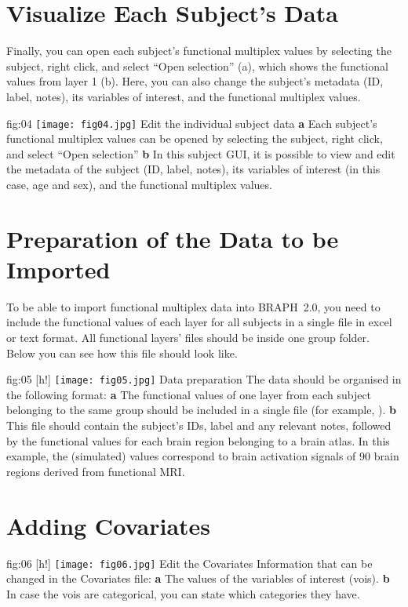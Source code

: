 \documentclass[justified]{tufte-handout}
\begin{document}
\section{Visualize Each Subject's Data}

Finally, you can open each subject's functional multiplex values by selecting the subject, right click, and select ``Open selection'' (a), which shows the functional values from layer 1 (b). Here, you can also change the subject's metadata (ID, label, notes), its variables of interest, and the functional multiplex values.

	{fig:04}
	{\texttt{[image: fig04.jpg]}
	}
	{Edit the individual subject data}
	{
	{\bf a}  Each subject's functional multiplex values can be opened by selecting the subject, right click, and select ``Open selection''
	{\bf b} In this subject GUI, it is possible to view and edit the metadata of the subject (ID, label, notes), its variables of interest (in this case, age and sex), and the functional multiplex values. 
	}

\clearpage
\section{Preparation of the Data to be Imported}

To be able to import functional multiplex data into BRAPH~2.0, you need to include the functional values of each layer for all subjects in a single file in excel or text format. All functional layers' files should be inside one group folder. Below you can see how this file should look like.

	{fig:05}
	{
	[h!]
	\texttt{[image: fig05.jpg]}
	}
	{Data preparation}
	{
	The data should be organised in the following format:
	{\bf a} The functional values of one layer from each subject belonging to the same group should be included in a single file (for example, ). 
	{\bf b} This file should contain the subject's IDs, label and any relevant notes, followed by the functional values for each brain region belonging to a brain atlas. In this example, the (simulated) values correspond to brain activation signals of 90 brain regions derived from functional MRI.
	} 

\section{Adding Covariates}

	{fig:06}
	{
	[h!]
	\texttt{[image: fig06.jpg]}
	}
	{Edit the Covariates}
	{
	Information that can be changed in the Covariates file: 
	{\bf a} The values of the variables of interest (vois).
	{\bf b} In case the vois are categorical, you can state which categories they have.
	}
	
\end{document}
